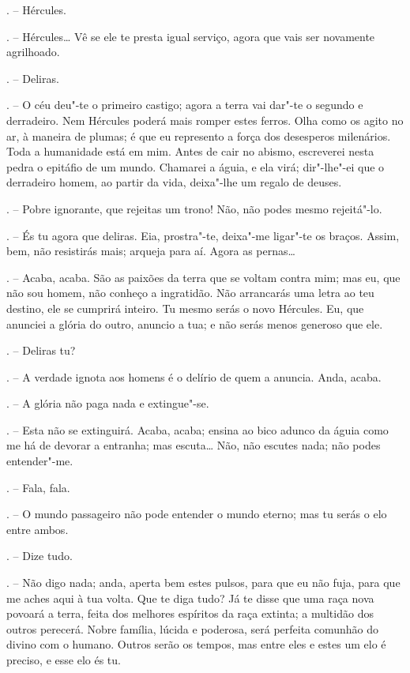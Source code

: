 \begin{Parskip}
. -- Hércules.

. -- Hércules\ldots{} Vê se ele te presta igual serviço, agora que
vais ser novamente agrilhoado.

. -- Deliras.

. -- O céu deu"-te o primeiro castigo; agora a terra vai dar"-te
o segundo e derradeiro. Nem Hércules poderá mais romper estes ferros.
Olha como os agito no ar, à maneira de plumas; é que eu represento a
força dos desesperos milenários. Toda a humanidade está em mim. Antes de
cair no abismo, escreverei nesta pedra o epitáfio de um mundo. Chamarei
a águia, e ela virá; dir"-lhe"-ei que o derradeiro homem, ao partir da
vida, deixa"-lhe um regalo de deuses.

. -- Pobre ignorante, que rejeitas um trono! Não, não podes
mesmo rejeitá"-lo.

. -- És tu agora que deliras. Eia, prostra"-te, deixa"-me
ligar"-te os braços. Assim, bem, não resistirás mais; arqueja para aí.
Agora as pernas\ldots{}

. -- Acaba, acaba. São as paixões da terra que se voltam contra
mim; mas eu, que não sou homem, não conheço a ingratidão. Não arrancarás
uma letra ao teu destino, ele se cumprirá inteiro. Tu mesmo serás o novo
Hércules. Eu, que anunciei a glória do outro, anuncio a tua; e não serás
menos generoso que ele.

. -- Deliras tu?

. -- A verdade ignota aos homens é o delírio de quem a anuncia.
Anda, acaba.

. -- A glória não paga nada e extingue"-se.

. -- Esta não se extinguirá. Acaba, acaba; ensina ao bico adunco
da águia como me há de devorar a entranha; mas escuta\ldots{} Não, não
escutes nada; não podes entender"-me.

. -- Fala, fala.

. -- O mundo passageiro não pode entender o mundo eterno; mas tu
serás o elo entre ambos.

. -- Dize tudo.

. -- Não digo nada; anda, aperta bem estes pulsos, para que eu
não fuja, para que me aches aqui à tua volta. Que te diga tudo? Já te
disse que uma raça nova povoará a terra, feita dos melhores espíritos da
raça extinta; a multidão dos outros perecerá. Nobre família, lúcida e
poderosa, será perfeita comunhão do divino com o humano. Outros serão os
tempos, mas entre eles e estes um elo é preciso, e esse elo és tu.


\end{Parskip}
